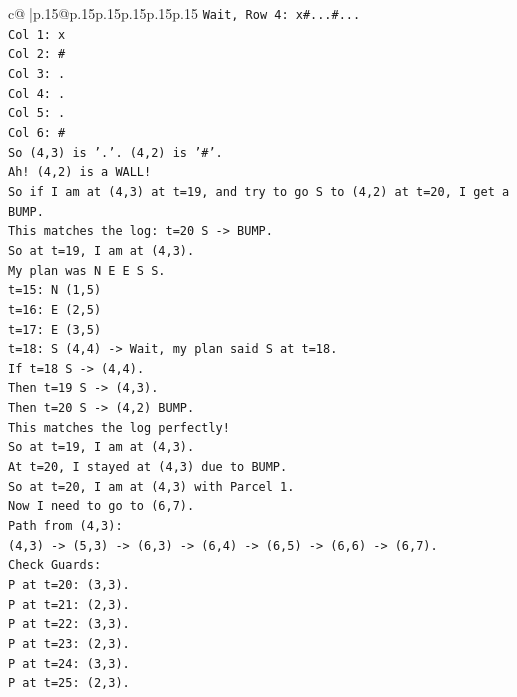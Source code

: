 \documentclass{article}
\begin{document}
{\begin{supertabular}{c@{$\;$}|p{.15\linewidth}@{}p{.15\linewidth}p{.15\linewidth}p{.15\linewidth}p{.15\linewidth}p{.15\linewidth}}
{{{\texttt{Wait, Row 4: x\#...\#...} \\
\texttt{Col 1: x} \\
\texttt{Col 2: \#} \\
\texttt{Col 3: .} \\
\texttt{Col 4: .} \\
\texttt{Col 5: .} \\
\texttt{Col 6: \#} \\
\texttt{So (4,3) is '.'. (4,2) is '\#'.} \\
\texttt{Ah! (4,2) is a WALL!} \\
\texttt{So if I am at (4,3) at t=19, and try to go S to (4,2) at t=20, I get a BUMP.} \\
\texttt{This matches the log: t=20 S {-}> BUMP.} \\
\texttt{So at t=19, I am at (4,3).} \\
\texttt{My plan was N E E S S.} \\
\texttt{t=15: N (1,5)} \\
\texttt{t=16: E (2,5)} \\
\texttt{t=17: E (3,5)} \\
\texttt{t=18: S (4,4) {-}> Wait, my plan said S at t=18.} \\
\texttt{If t=18 S {-}> (4,4).} \\
\texttt{Then t=19 S {-}> (4,3).} \\
\texttt{Then t=20 S {-}> (4,2) BUMP.} \\
\texttt{This matches the log perfectly!} \\
\texttt{So at t=19, I am at (4,3).} \\
\texttt{At t=20, I stayed at (4,3) due to BUMP.} \\
\texttt{So at t=20, I am at (4,3) with Parcel 1.} \\
\texttt{Now I need to go to (6,7).} \\
\texttt{Path from (4,3):} \\
\texttt{(4,3) {-}> (5,3) {-}> (6,3) {-}> (6,4) {-}> (6,5) {-}> (6,6) {-}> (6,7).} \\
\texttt{Check Guards:} \\
\texttt{P at t=20: (3,3).} \\
\texttt{P at t=21: (2,3).} \\
\texttt{P at t=22: (3,3).} \\
\texttt{P at t=23: (2,3).} \\
\texttt{P at t=24: (3,3).} \\
\texttt{P at t=25: (2,3).} \\
}}}
\end{supertabular}}
\end{document}
